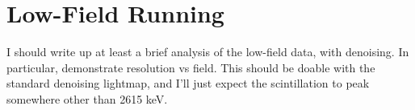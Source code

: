 \renewcommand{\thechapter}{3}
\chapter{Low-Field Running}

I should write up at least a brief analysis of the low-field data, with denoising.  In particular, demonstrate resolution vs field.  This should be doable with the standard denoising lightmap, and I'll just expect the scintillation to peak somewhere other than 2615 keV.
